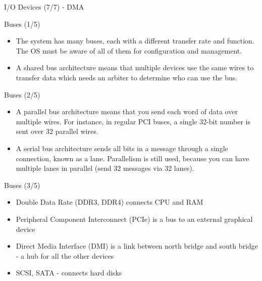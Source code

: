 \documentclass{beamer}
\begin{document}
\begin{frame}
{\centerline{I/O Devices (7/7) - DMA}}
\begin{figure}
    \centering
    
\end{figure}
\end{frame}

\begin{frame}
{\centerline{Buses (1/5)}}
\begin{itemize}
    \item The system has many buses, each with a different transfer rate and function. The OS must be aware of all of them for configuration and management.
    \item A shared bus architecture means that multiple devices use the same wires to transfer data which needs an arbiter to determine who can use the bus.
\end{itemize}
\end{frame}

\begin{frame}
{\centerline{Buses (2/5)}}
\begin{itemize}
    \item A parallel bus architecture means that you send each word of data over multiple wires. For instance, in regular PCI buses, a single 32-bit number is sent over 32 parallel wires.
    \begin{figure}
        \centering
        
    \end{figure}
    \item A serial bus architecture sends all bits in a message through a single connection, known as a lane. Parallelism is still used, because you can have multiple lanes in parallel (send 32 messages via 32 lanes).
    \begin{figure}
        \centering
        
    \end{figure}
\end{itemize}
\end{frame}

\begin{frame}
{\centerline{Buses (3/5)}}
\begin{itemize}
    \item Double Data Rate (DDR3, DDR4) connects CPU and RAM
    \item Peripheral Component Interconnect (PCIe) is a bus to an external graphical device
    \item Direct Media Interface (DMI) is a link between north bridge and south bridge - a hub for all the other devices
    \item SCSI, SATA - connects hard disks
\end{itemize}

\end{frame}
\end{document}

